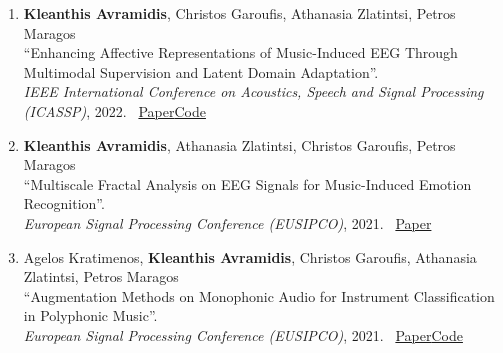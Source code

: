 \documentclass[margin]{res}
\begin{document}
\begin{resume}
\begin{enumerate}[leftmargin=*,itemsep=3pt]
\item \begin{minipage}[t]{\linewidth}\raggedright
    \textbf{Kleanthis Avramidis}, Christos Garoufis, Athanasia Zlatintsi, Petros Maragos \\
    ``Enhancing Affective Representations of Music-Induced EEG Through Multimodal Supervision and Latent Domain Adaptation''. \\
    \textit{IEEE International Conference on Acoustics, Speech and Signal Processing (ICASSP)}, 2022. \ \href{https://ieeexplore.ieee.org/abstract/document/9746643/}{Paper}\enspace \href{https://github.com/klean2050/EEG\_CrossModal}{Code}
\end{minipage}

\item \begin{minipage}[t]{\linewidth}\raggedright
    \textbf{Kleanthis Avramidis}, Athanasia Zlatintsi, Christos Garoufis, Petros Maragos \\
    ``Multiscale Fractal Analysis on EEG Signals for Music-Induced Emotion Recognition''. \\
    \textit{European Signal Processing Conference (EUSIPCO)}, 2021. \ \href{https://ieeexplore.ieee.org/abstract/document/9616140/}{Paper}
\end{minipage}

\item \begin{minipage}[t]{\linewidth}\raggedright
    Agelos Kratimenos, \textbf{Kleanthis Avramidis}, Christos Garoufis, Athanasia Zlatintsi, Petros Maragos \\
    ``Augmentation Methods on Monophonic Audio for Instrument Classification in Polyphonic Music''. \\
    \textit{European Signal Processing Conference (EUSIPCO)}, 2021. \ \href{https://ieeexplore.ieee.org/abstract/document/9287745/}{Paper}\enspace \href{https://github.com/klean2050/IC\_Augment}{Code}
\end{minipage}
\end{enumerate}

\end{resume}
\end{document}
